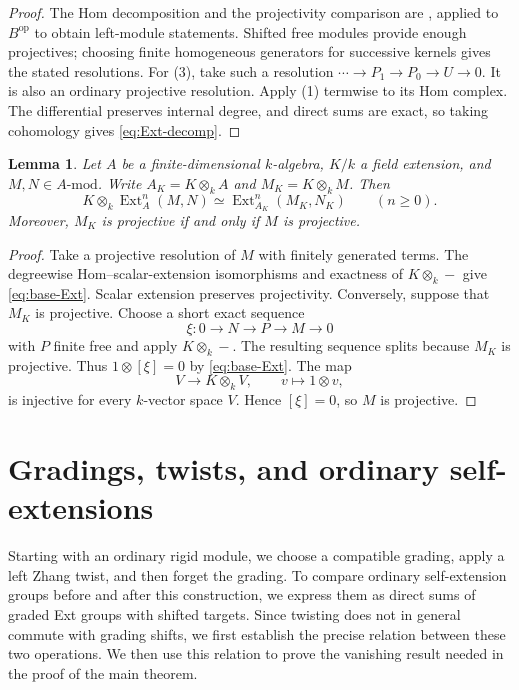 \documentclass[10pt,a4paper]{amsart}
\numberwithin{equation}{section}
\newtheorem{lemma}[definition]{Lemma}
\DeclareMathOperator{\Ext}{Ext}
\newcommand{\umod}[1]{#1\text{-}\mathrm{mod}}
\begin{document}
\begin{proof}
The Hom decomposition and the projectivity comparison are
\cite[Theorem 1.2.6 and Proposition 1.2.15]{Hazrat16}, applied to
\(B^{\mathrm{op}}\) to obtain left-module statements. Shifted free
modules provide enough projectives; choosing finite homogeneous
generators for successive kernels gives the stated resolutions.
For (3), take such a resolution
\(\cdots\to P_1\to P_0\to U\to0\). It is also an ordinary projective
resolution. Apply (1) termwise to its Hom complex. The differential
preserves internal degree, and direct sums are exact, so taking
cohomology gives \eqref{eq:Ext-decomp}.
\end{proof}

\begin{lemma}\label{lem:base-change}
Let \(A\) be a finite-dimensional \(k\)-algebra, \(K/k\) a field
extension, and \(M,N\in\umod{A}\). Write \(A_K=K\otimes_k A\) and
\(M_K=K\otimes_kM\). Then
\begin{equation}\label{eq:base-Ext}
 K\otimes_k\Ext_A^n(M,N)\simeq\Ext_{A_K}^n(M_K,N_K)
 \qquad(n\geq0).
\end{equation}
Moreover, \(M_K\) is projective if and only if \(M\) is projective.
\end{lemma}

\begin{proof}
Take a projective resolution of \(M\) with finitely generated terms.
The degreewise Hom--scalar-extension isomorphisms and exactness of
\(K\otimes_k-\) give \eqref{eq:base-Ext}. Scalar extension preserves
projectivity. Conversely, suppose that \(M_K\) is projective.
Choose a short exact sequence
\[
 \xi:0\longrightarrow N\longrightarrow P
 \longrightarrow M\longrightarrow0
\]
with \(P\) finite free and apply \(K\otimes_k-\).
The resulting sequence splits because \(M_K\) is projective.
Thus \(1\otimes[\xi]=0\) by \eqref{eq:base-Ext}.
The map
\[
 V\longrightarrow K\otimes_k V,
 \qquad v\longmapsto1\otimes v,
\]
is injective for every \(k\)-vector space \(V\).
Hence \([\xi]=0\), so \(M\) is projective.
\end{proof}

\section{Gradings, twists, and ordinary self-extensions}\label{sec:transport}

Starting with an ordinary rigid module, we choose a compatible grading, apply a left Zhang twist, and then forget the grading. To compare ordinary self-extension groups before and after this construction, we express them as direct sums of graded Ext groups with shifted targets. Since twisting does not in general commute with grading shifts, we first establish the precise relation between these two operations. We then use this relation to prove the vanishing result needed in the proof of the main theorem.
\end{document}
